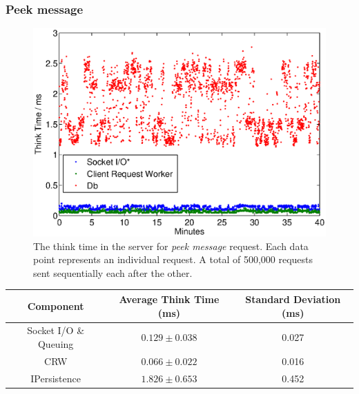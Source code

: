 \documentclass{article}
\begin{document}
            \subsubsection{Peek message}
                \begin{figure}[H]
                    \includegraphics[scale=0.50]{thinktime_500k_peek}
                    \caption{The think time in the server for \textit{peek message} request. Each data point represents an individual request. A total of 500,000 requests sent sequentially each after the other.}
                    \label{fig:thinktime_500k_peek}
                \end{figure}
                \begin{table}[H]
                    \begin{tabular}{|c|c|c|}
                        \hline 
                        \textbf{Component} & \textbf{Average Think Time} (ms)  & \textbf{Standard Deviation (ms)} \\ 
                        \hline 
                        Socket I/O \& Queuing &$0.129\pm0.038$ &0.027\\ 
                        \hline 
                        CRW &$0.066\pm0.022$ &0.016\\ 
                        \hline 
                        IPersistence &$1.826\pm0.653$ &0.452\\ 
                        \hline 
                    \end{tabular}
                \end{table} 
\end{document}
